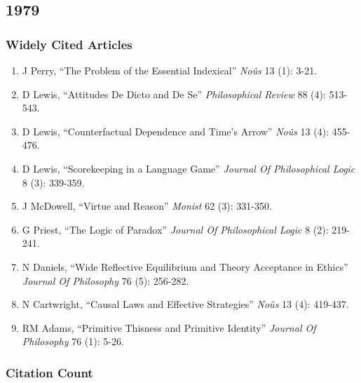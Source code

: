 \documentclass[
  10pt,
  letterpaper,
  DIV=11,
  numbers=noendperiod,
  twoside]{scrartcl}
\providecommand{\tightlist}{%
  \setlength{\itemsep}{0pt}\setlength{\parskip}{0pt}}\usepackage{longtable,booktabs,array}
\begin{document}
\newpage

\subsection{1979}\label{section-3}

\subsubsection*{Widely Cited Articles}\label{widely-cited-articles-3}

\begin{enumerate}
\def\labelenumi{\arabic{enumi}.}
\tightlist
\item
  J Perry, ``The Problem of the Essential Indexical'' \emph{Noûs} 13
  (1): 3-21.
\item
  D Lewis, ``Attitudes De Dicto and De Se'' \emph{Philosophical Review}
  88 (4): 513-543.
\item
  D Lewis, ``Counterfactual Dependence and Time's Arrow'' \emph{Noûs} 13
  (4): 455-476.
\item
  D Lewis, ``Scorekeeping in a Language Game'' \emph{Journal Of
  Philosophical Logic} 8 (3): 339-359.
\item
  J McDowell, ``Virtue and Reason'' \emph{Monist} 62 (3): 331-350.
\item
  G Priest, ``The Logic of Paradox'' \emph{Journal Of Philosophical
  Logic} 8 (2): 219-241.
\item
  N Daniels, ``Wide Reflective Equilibrium and Theory Acceptance in
  Ethics'' \emph{Journal Of Philosophy} 76 (5): 256-282.
\item
  N Cartwright, ``Causal Laws and Effective Strategies'' \emph{Noûs} 13
  (4): 419-437.
\item
  RM Adams, ``Primitive Thisness and Primitive Identity'' \emph{Journal
  Of Philosophy} 76 (1): 5-26.
\end{enumerate}

\subsubsection*{Citation Count}\label{citation-count-3}
\end{document}
